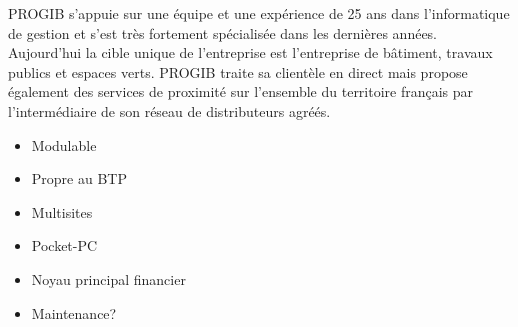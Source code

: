 {
    PROGIB s'appuie sur une équipe et une expérience de 25 ans dans l'informatique de gestion et s'est très fortement spécialisée dans les dernières années.
    Aujourd'hui la cible unique de l'entreprise est l'entreprise de bâtiment, travaux publics et espaces verts.
    PROGIB traite sa clientèle en direct mais propose également des services de proximité sur l'ensemble du territoire
    français par l'intermédiaire de son réseau de distributeurs agréés.
}
{
    \begin{itemize}
        \item Modulable
        \item Propre au BTP
        \item Multisites
        \item Pocket-PC
    \end{itemize}
}
{
    \begin{itemize}
        \item Noyau principal financier
        \item Maintenance?
    \end{itemize}
}
